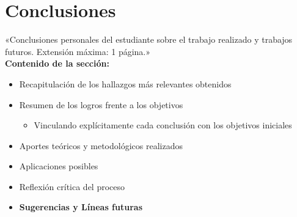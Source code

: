 \chapter{Conclusiones}
«Conclusiones personales del estudiante sobre el trabajo realizado y trabajos futuros. Extensión máxima: 1 página.»\\

\textbf{Contenido de la sección:}
\begin{itemize}
    \item Recapitulación de los hallazgos más relevantes obtenidos
    \item Resumen de los logros frente a los objetivos
    \begin{itemize}
        \item Vinculando explícitamente cada conclusión con los objetivos iniciales
    \end{itemize}
    \item Aportes teóricos y metodológicos realizados
    \item Aplicaciones posibles
    \item Reflexión crítica del proceso
    \item \textbf{Sugerencias y Líneas futuras}
\end{itemize}

